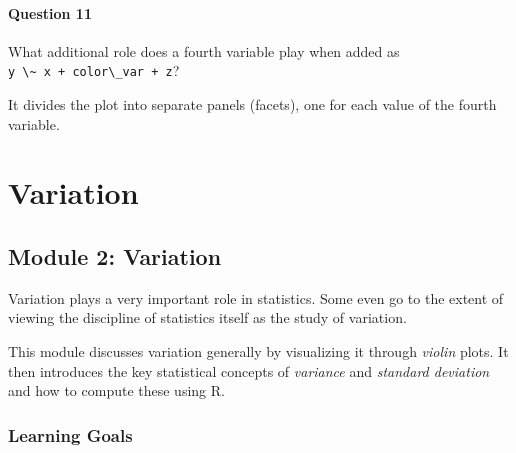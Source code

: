 \documentclass[
  12pt,
  letterpaper,
  DIV=11,
  numbers=noendperiod]{scrreprt}
\newcommand{\passthrough}[1]{#1}
\begin{document}
\subsection*{Question 11}\label{question-11}

What additional role does a fourth variable play when added as\\
\passthrough{\lstinline!y \~ x + color\_var + z!}?

\begin{tcolorbox}[enhanced jigsaw, colback=white, leftrule=.75mm, toprule=.15mm, bottomtitle=1mm, breakable, coltitle=black, toptitle=1mm, title={Suggested answer}, opacitybacktitle=0.6, colbacktitle=quarto-callout-note-color!10!white, arc=.35mm, left=2mm, colframe=quarto-callout-note-color-frame, titlerule=0mm, rightrule=.15mm, bottomrule=.15mm, opacityback=0]

It divides the plot into separate panels (facets), one for each value of
the fourth variable.

\end{tcolorbox}

\part{Variation}

\chapter*{Module 2: Variation}\label{module-2-variation}


Variation plays a very important role in statistics. Some even go to the
extent of viewing the discipline of statistics itself as the study of
variation.

This module discusses variation generally by visualizing it through
\emph{violin} plots. It then introduces the key statistical concepts of
\emph{variance} and \emph{standard deviation} and how to compute these
using R.

\section*{Learning Goals}\label{learning-goals-1}

\end{document}
